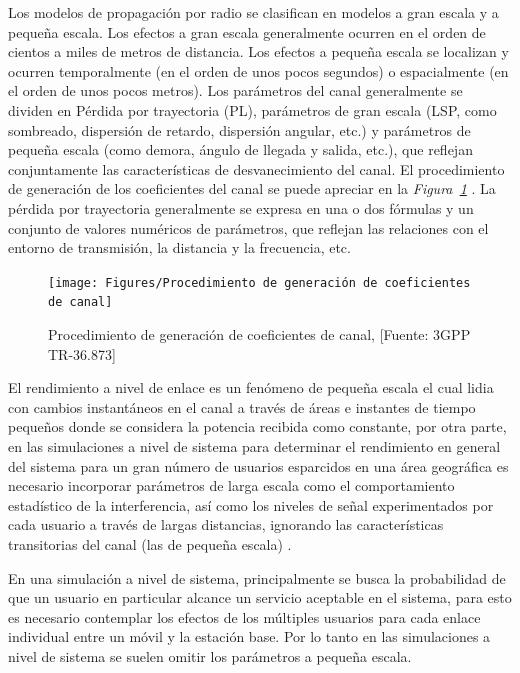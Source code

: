 Los modelos de propagación por radio se clasifican en modelos a gran escala y a pequeña escala. Los efectos a gran escala generalmente ocurren en el orden de cientos a miles de metros de distancia. Los efectos a pequeña escala se localizan y ocurren temporalmente (en el orden de unos pocos segundos) o espacialmente (en el orden de unos pocos metros). Los parámetros del canal generalmente se dividen en Pérdida por trayectoria (PL), parámetros de gran escala (LSP, como sombreado, dispersión de retardo, dispersión angular, etc.) y parámetros de pequeña escala (como demora, ángulo de llegada y salida, etc.), que reflejan conjuntamente las características de desvanecimiento del canal. El procedimiento de generación de los coeficientes del canal se puede apreciar en la \textit{Figura~\ref{fig:Procedimiento de generacion de coeficientes de canal} }. La pérdida por trayectoria generalmente se expresa en una o dos fórmulas y un conjunto de valores numéricos de parámetros, que reflejan las relaciones con el entorno de transmisión, la distancia y la frecuencia, etc. \newline

\begin{figure}[th]
\centering
\texttt{[image: Figures/Procedimiento de generación de coeficientes de canal]}
\decoRule
\caption[Procedimiento de generación de coeficientes de canal]{Procedimiento de generación de coeficientes de canal, [Fuente: 3GPP TR-36.873]}
\label{fig:Procedimiento de generacion de coeficientes de canal}
\end{figure}

El rendimiento a nivel de enlace es un fenómeno de pequeña escala el cual lidia con cambios instantáneos en el canal a través de áreas e instantes de tiempo pequeños donde se considera la potencia recibida como constante, por otra parte, en las simulaciones a nivel de sistema para determinar el rendimiento en general del sistema para un gran número de usuarios esparcidos en una área geográfica es necesario incorporar parámetros de larga escala como el comportamiento estadístico de la interferencia, así como los niveles de señal experimentados por cada usuario a través de largas distancias, ignorando las características transitorias del canal (las de pequeña escala) \parencite{Tranter2003}.\newline

En una simulación a nivel de sistema, principalmente se busca la probabilidad de que un usuario en particular alcance un servicio aceptable en el sistema, para esto es necesario contemplar los efectos de los múltiples usuarios para cada enlace individual entre un móvil y la estación base. Por lo tanto en las simulaciones a nivel de sistema se suelen omitir los parámetros a pequeña escala.\newline

